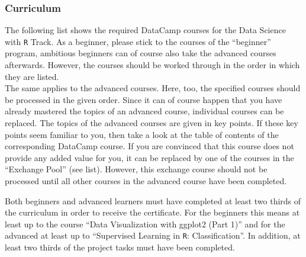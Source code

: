 \documentclass[
  11pt,
]{article}
\begin{document}
\hypertarget{curriculum}{%
\subsubsection{Curriculum}\label{curriculum}}

The following list shows the required DataCamp courses for the Data Science with \texttt{R} Track. As a beginner, please stick to the courses of the ``beginner'' program, ambitious beginners can of course also take the advanced courses afterwards. However, the courses should be worked through in the order in which they are listed.\\
The same applies to the advanced courses. Here, too, the specified courses should be processed in the given order. Since it can of course happen that you have already mastered the topics of an advanced course, individual courses can be replaced. The topics of the advanced courses are given in key points. If these key points seem familiar to you, then take a look at the table of contents of the corresponding DataCamp course. If you are convinced that this course does not provide any added value for you, it can be replaced by one of the courses in the ``Exchange Pool'' (see list). However, this exchange course should not be processed until all other courses in the advanced course have been completed.

Both beginners and advanced learners must have completed at least two thirds of the curriculum in order to receive the certificate. For the beginners this means at least up to the course ``Data Visualization with ggplot2 (Part 1)'' and for the advanced at least up to ``Supervised Learning in \texttt{R}: Classification''. In addition, at least two thirds of the project tasks must have been completed.
\end{document}
